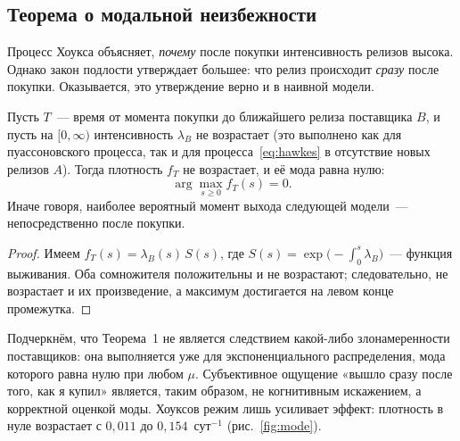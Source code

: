 \documentclass[11pt,a4paper]{article}
\begin{document}
\subsection{Теорема о модальной неизбежности}

Процесс Хоукса объясняет, \emph{почему} после покупки интенсивность релизов высока. Однако закон подлости утверждает большее: что релиз происходит \emph{сразу} после покупки. Оказывается, это утверждение верно и в наивной модели.

\begin{theorem}
Пусть $T$~--- время от момента покупки до ближайшего релиза поставщика $B$, и пусть на $[0,\infty)$ интенсивность $\lambda_B$ не возрастает (это выполнено как для пуассоновского процесса, так и для процесса~\eqref{eq:hawkes} в отсутствие новых релизов $A$). Тогда плотность $f_T$ не возрастает, и её мода равна нулю:
\[
\arg\max_{s\ge 0} f_T(s) = 0.
\]
Иначе говоря, наиболее вероятный момент выхода следующей модели~--- непосредственно после покупки.
\end{theorem}

\begin{proof}
Имеем $f_T(s) = \lambda_B(s)\,S(s)$, где $S(s) = \exp\bigl(-\int_0^s \lambda_B\bigr)$~--- функция выживания. Оба сомножителя положительны и не возрастают; следовательно, не возрастает и их произведение, а максимум достигается на левом конце промежутка.
\end{proof}

Подчеркнём, что Теорема~1 не является следствием какой-либо злонамеренности поставщиков: она выполняется уже для экспоненциального распределения, мода которого равна нулю при любом $\mu$. Субъективное ощущение «вышло сразу после того, как я купил» является, таким образом, не когнитивным искажением, а корректной оценкой моды. Хоуксов режим лишь усиливает эффект: плотность в нуле возрастает с $0{,}011$ до $0{,}154$~сут$^{-1}$ (рис.~\ref{fig:mode}).
\end{document}
